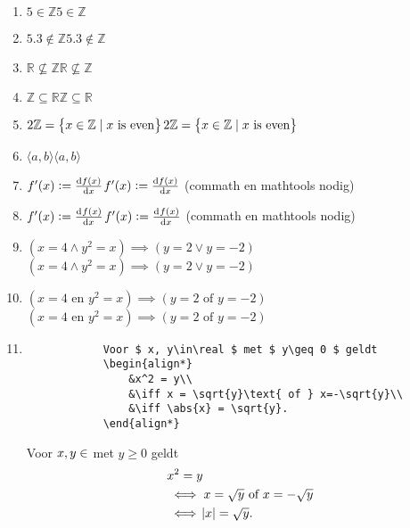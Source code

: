 \documentclass{article}
\newenvironment{demobox}{
    \begin{adjustbox}{frame=1pt 10pt}%
        \begin{minipage}{\linewidth-22pt}
}{
        \end{minipage}
    \end{adjustbox}
}
\begin{document}
\begin{enumerate}
        \item \texttt{$ 5\in\mathbb{Z} $}\qquad $ 5\in\mathbb{Z} $
        \item \texttt{$ 5.3\not\in\mathbb{Z} $}\qquad $ 5.3\not\in\mathbb{Z} $
        \item \texttt{$ \mathbb{R}\not\subseteq \mathbb{Z} $}\qquad $ \mathbb{R}\not\subseteq \mathbb{Z} $
        \item \texttt{$ \mathbb{Z}\subseteq \mathbb{R} $}\qquad $ \mathbb{Z}\subseteq \mathbb{R} $
        \item \texttt{$ 2\mathbb{Z} = \left\{x\in\mathbb{Z}\mid\text{$ x $ is even}\right\} $}\qquad $ 2\mathbb{Z} = \left\{x\in\mathbb{Z}\mid\text{$ x $ is even}\right\} $
        \item \texttt{$ \langle a,b\rangle $}\qquad $ \langle a,b\rangle $
        \item \texttt{$ f'(x) := \frac{\dif f(x)}{\dif x} $}\qquad $ f'(x) := \frac{\dif f(x)}{\dif x} $ (commath en mathtools nodig)
        \item \texttt{$ f'(x) := \od{f(x)}{x} $}\qquad $ f'(x) := \od{f(x)}{x} $ (commath en mathtools nodig)
        \item \texttt{$ (x=4\wedge y^2=x)\implies (y=2\vee y=-2) $}\qquad $ (x=4\wedge y^2=x)\implies (y=2\vee y=-2) $
        \item \texttt{$ (x=4\text{ en } y^2=x)\implies (y=2\text{ of } y=-2 )$}\qquad $ (x=4\text{ en } y^2=x)\implies (y=2\text{ of } y=-2 )$
        \item \begin{verbatim}
            Voor $ x, y\in\real $ met $ y\geq 0 $ geldt
            \begin{align*}
                &x^2 = y\\
                &\iff x = \sqrt{y}\text{ of } x=-\sqrt{y}\\
                &\iff \abs{x} = \sqrt{y}.
            \end{align*}
        \end{verbatim}
        \begin{demobox}
            Voor $ x, y\in\real $ met $ y\geq 0 $ geldt
            \begin{align*}
                &x^2 = y\\
                &\iff x = \sqrt{y}\text{ of } x=-\sqrt{y}\\
                &\iff \abs{x} = \sqrt{y}.
            \end{align*}

\end{demobox}
\end{enumerate}
\end{document}

